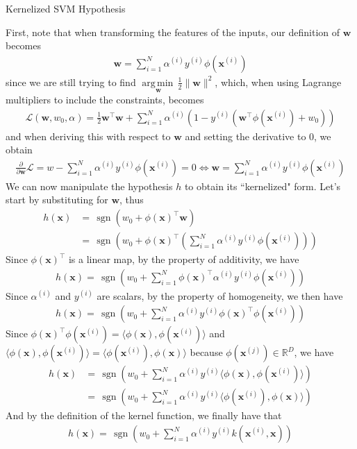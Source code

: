 \documentclass[12pt]{article}
\newcommand{\paren}[1]{\left(#1\right)}
\newcommand{\norm}[1]{\lVert#1\rVert}
\newcommand{\argmin}[1]{\underset{#1}{\operatorname{arg\,min\,}}}
\DeclareMathOperator{\sgn}{\,sgn}
\begin{document}
\begin{center}
	\LARGE{Kernelized SVM Hypothesis}
\end{center}
First, note that when transforming the features of the inputs, our definition of $\mathbf{w}$ becomes
\begin{gather*}
\mathbf{w} = \sum_{i=1}^{N}\alpha^{(i)}y^{(i)}\phi(\mathbf{x}^{(i)})
\end{gather*}
since we are still trying to find $\argmin{\mathbf{w}}\frac{1}{2}\norm{\mathbf{w}}^2$, which, when using Lagrange multipliers to include the constraints, becomes
\begin{gather*}
\mathcal{L}(\mathbf{w}, w_0, \alpha) = \frac{1}{2}\mathbf{w}^\top\mathbf{w} + \sum_{i=1}^{N}\alpha^{(i)}(1 - y^{(i)}(\mathbf{w}^\top\phi(\mathbf{x}^{(i)}) + w_0))
\end{gather*}
and when deriving this with respect to $\mathbf{w}$ and setting the derivative to $0$, we obtain
\begin{gather*}
\frac{\partial}{\partial\mathbf{w}}\mathcal{L} = w - \sum_{i=1}^{N}\alpha^{(i)}y^{(i)}\phi(\mathbf{x}^{(i)}) = 0 \iff \mathbf{w} = \sum_{i=1}^{N}\alpha^{(i)}y^{(i)}\phi(\mathbf{x}^{(i)})
\end{gather*}
We can now manipulate the hypothesis $h$ to obtain its ``kernelized" form. Let's start by substituting for $\mathbf{w}$, thus
\begin{align*}
h(\mathbf{x}) & = \sgn\paren{w_0 + \phi(\mathbf{x})^\top\mathbf{w}} \\
& = \sgn\paren{w_0 + \phi(\mathbf{x})^\top\paren{\sum_{i=1}^{N}\alpha^{(i)}y^{(i)}\phi(\mathbf{x}^{(i)})}}
\end{align*}
Since $\phi(\mathbf{x})^\top$ is a linear map, by the property of additivity, we have
\begin{gather*}
h(\mathbf{x}) = \sgn\paren{w_0 + \sum_{i=1}^{N}\phi(\mathbf{x})^\top\alpha^{(i)}y^{(i)}\phi(\mathbf{x}^{(i)})}
\end{gather*}
Since $\alpha^{(i)}$ and $y^{(i)}$ are scalars, by the property of homogeneity, we then have
\begin{gather*}
h(\mathbf{x}) = \sgn\paren{w_0 + \sum_{i=1}^{N}\alpha^{(i)}y^{(i)}\phi(\mathbf{x})^\top\phi(\mathbf{x}^{(i)})}
\end{gather*}
Since $\phi(\mathbf{x})^\top\phi(\mathbf{x}^{(i)}) = \langle\phi(\mathbf{x}), \phi(\mathbf{x}^{(i)})\rangle$ and $\langle\phi(\mathbf{x}), \phi(\mathbf{x}^{(i)})\rangle = \langle\phi(\mathbf{x}^{(i)}), \phi(\mathbf{x})\rangle$ because ${\phi(\mathbf{x}^{(j)}) \in \mathbb{R}^D}$, we have
\begin{align*}
h(\mathbf{x}) & = \sgn\paren{w_0 + \sum_{i=1}^{N}\alpha^{(i)}y^{(i)}\langle\phi(\mathbf{x}), \phi(\mathbf{x}^{(i)})\rangle} \\
& = \sgn\paren{w_0 + \sum_{i=1}^{N}\alpha^{(i)}y^{(i)}\langle\phi(\mathbf{x}^{(i)}), \phi(\mathbf{x})\rangle}
\end{align*}
And by the definition of the kernel function, we finally have that
\begin{gather*}
h(\mathbf{x}) = \sgn\paren{w_0 + \sum_{i=1}^{N}\alpha^{(i)}y^{(i)}k(\mathbf{x}^{(i)}, \mathbf{x})}
\end{gather*}
\end{document}
